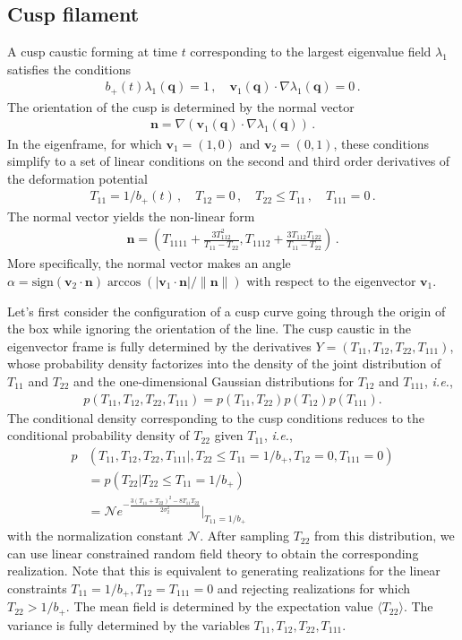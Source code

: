 \documentclass[a4paper, 11pt]{article}
\begin{document}
\subsection{Cusp filament}
A cusp caustic forming at time $t$ corresponding to the largest eigenvalue field $\lambda_1$ satisfies the conditions
\begin{align}
b_+(t) \lambda_1(\bm{q}) = 1\,, \quad \bm{v}_1(\bm{q}) \cdot \nabla\lambda_1(\bm{q}) = 0\,.
\end{align}
The orientation of the cusp is determined by the normal vector
\begin{align}
\bm{n} =  \nabla(\bm{v}_1(\bm{q}) \cdot \nabla\lambda_1(\bm{q}))\,.
\end{align}
In the eigenframe, for which $\bm{v}_1=(1,0)$ and $\bm{v}_2=(0,1)$, these conditions simplify to a set of linear conditions on the second and third order derivatives of the deformation potential
\begin{align}
T_{11}=1/b_+(t)\,, \quad T_{12}=0\,,\quad T_{22}\leq T_{11}\,,\quad T_{111}=0\,.
\end{align}
The normal vector yields the non-linear form
\begin{align}
\bm{n}=\left(T_{1111} + \frac{3T_{112}^2}{T_{11}-T_{22}}, T_{1112} + \frac{3T_{112}T_{122}}{T_{11}-T_{22}}\right)\,.
\end{align}
More specifically, the normal vector makes an angle $\alpha = \text{sign}(\bm{v}_2\cdot \bm{n}) \arccos\left(|\bm{v}_1\cdot \bm{n}|/ \|\bm{n}\|\right)$ with respect to the eigenvector $\bm{v}_1$.

Let's first consider the configuration of a cusp curve going through the origin of the box while ignoring the orientation of the line. The cusp caustic in the eigenvector frame is fully determined by the derivatives $Y=(T_{11},T_{12},T_{22},T_{111})$, whose probability density factorizes into the density of the joint distribution of $T_{11}$ and $T_{22}$ and the one-dimensional Gaussian distributions for $T_{12}$ and $T_{111}$, \textit{i.e.},
\begin{align}
p(T_{11},T_{12},T_{22},T_{111}) = p(T_{11},T_{22})p(T_{12})p(T_{111}).
\end{align}
The conditional density corresponding to the cusp conditions reduces to the conditional probability density of $T_{22}$ given $T_{11}$, \textit{i.e.},
\begin{align}
p&(T_{11},T_{12},T_{22},T_{111}|,T_{22}\leq T_{11}=1/b_+,T_{12}=0,T_{111}=0) \\
&= p(T_{22}| T_{22} \leq T_{11}=1/b_+)\\
&= \mathcal{N} e^{-\frac{3(T_{11} + T_{22})^2 - 8 T_{11} T_{22}}{2 \sigma_2^2}}\big|_{T_{11}=1/b_+}
\end{align}
with the normalization constant $\mathcal{N}$. After sampling $T_{22}$ from this distribution, we can use linear constrained random field theory to obtain the corresponding realization. Note that this is equivalent to generating realizations for the linear constraints $T_{11}=1/b_+,T_{12}=T_{111}=0$ and rejecting realizations for which $T_{22} > 1/b_+$. The mean field is determined by the expectation value $\langle T_{22} \rangle$. The variance is fully determined by the variables $T_{11},T_{12},T_{22},T_{111}$.
\end{document}
